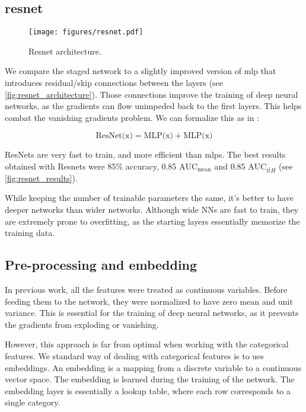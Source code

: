 \subsection[resnet]{\gls{resnet}}
\label{sec:resnet}

\begin{figure}[htbp]
    \centering
    \texttt{[image: figures/resnet.pdf]}
    \caption{Resnet architecture.}
    \label{fig:resnet_architecture}
\end{figure}

We compare the staged network to a slightly improved version of \gls{mlp} that introduces residual/skip
connections between the layers (see \autoref{fig:resnet_architecture}).
Those connections improve the training of deep neural networks, as the gradients can flow unimpeded back to the first
layers. This helps combat the vanishing gradients problem. We can formalize this as in
\cite{ft-transformer}:

$$
    \text{ResNet(x)} = \text{MLP(x)} + \text{MLP(x)}
$$

ResNets are very fast to train, and more efficient than mlps. The best results obtained with Resnets were 85\% accuracy,
0.85 $\text{AUC}_\text{mean}$ and 0.85 $\text{AUC}_{t\bar{t}H}$ (see \autoref{fig:resnet_results}).

While keeping the number of trainable parameters the same, it's better to have deeper networks than wider networks.
Although wide NNs are fast to train, they are extremely prone to overfitting, as the starting layers essentially
memorize the training data.


\subsection{Pre-processing and embedding}

In previous work, all the features were treated as continuous variables. Before feeding them to the network, they were
normalized to have zero mean and unit variance. This is essential for the training of deep neural networks, as it
prevents the gradients from exploding or vanishing.

However, this approach is far from optimal when working with the categorical features. We standard way of dealing with
categorical features is to ues embeddings. An embedding is a mapping from a discrete variable to a continuous vector
space. The embedding is learned during the training of the network. The embedding layer is essentially a lookup table,
where each row corresponds to a single category.

